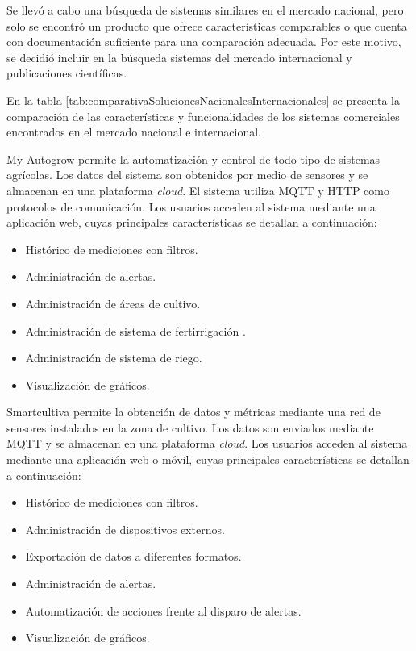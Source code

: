Se llevó a cabo una búsqueda de sistemas similares en el mercado nacional, pero solo se encontró un producto que ofrece características comparables o que cuenta con documentación suficiente para una comparación adecuada. Por este motivo, se decidió incluir en la búsqueda sistemas del mercado internacional y publicaciones científicas. 

En la tabla \ref{tab:comparativaSolucionesNacionalesInternacionales} se presenta la comparación de las características y funcionalidades de los sistemas comerciales encontrados en el mercado nacional e internacional.

My Autogrow \citep{WEBSITE:MYAUTOGROW} permite la automatización y control de todo tipo de sistemas agrícolas. Los datos del sistema son obtenidos por medio de sensores y se almacenan en una plataforma \emph{cloud}. El sistema utiliza MQTT y HTTP como protocolos de comunicación. Los usuarios acceden al sistema mediante una aplicación web, cuyas principales características se detallan a continuación: 

\begin{itemize}
	\item Histórico de mediciones con filtros.
	\item Administración de alertas.
	\item Administración de áreas de cultivo.
	\item Administración de sistema de fertirrigación \citep{WEBSITE:FERTIRRIGACION}.
	\item Administración de sistema de riego.
	\item Visualización de gráficos.
\end{itemize}

Smartcultiva \citep{WEBSITE:PLIOT} permite la obtención de datos y métricas mediante una red de sensores instalados en la zona de cultivo. Los datos son enviados mediante MQTT y se almacenan en una plataforma \emph{cloud}. Los usuarios acceden al sistema mediante una aplicación web o móvil, cuyas principales características se detallan a continuación: 

\begin{itemize}
	\item Histórico de mediciones con filtros.
	\item Administración de dispositivos externos.
	\item Exportación de datos a diferentes formatos.
	\item Administración de alertas.
	\item Automatización de acciones frente al disparo de alertas.
	\item Visualización de gráficos.
\end{itemize}

